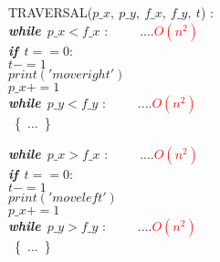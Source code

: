 \documentclass[30pt]{article}
\begin{document}
\begin{algorithm}
TRAVERSAL($p\_x,\ p\_y,\ f\_x,\ f\_y,\ t$) :\\
\hspace{1cm}\textbf{\textit{while}}\ $p\_x<f\_x$ :\ \ \ \ \ ....\textcolor{red}{$O(n^2)$}\\
\hspace{1.7cm}\textbf{\textit{if}}\ $t==0$: \\
\hspace{2.1cm}$t -= 1$ \\
\hspace{2.1cm}$ print('move right')$  \\
\hspace{2.1cm}$ p\_x += 1$ \\

\hspace{1cm}\textbf{\textit{while}}\ $p\_y<f\_y$ :\ \ \ \ \ ....\textcolor{red}{$O(n^2)$}\\
\hspace{1.7cm}\ \{\ ...\ \}

\hspace{1cm}\textbf{\textit{while}}\ $p\_x>f\_x$ :\ \ \ \ \ ....\textcolor{red}{$O(n^2)$}\\
\hspace{1.7cm}\textbf{\textit{if}}\ $t==0$: \\
\hspace{2.1cm}$t -= 1$ \\
\hspace{2.1cm}$ print('move left')$  \\
\hspace{2.1cm}$ p\_x += 1$ \\

\hspace{1cm}\textbf{\textit{while}}\ $p\_y>f\_y$ :\ \ \ \ \ ....\textcolor{red}{$O(n^2)$}\\
\hspace{1.7cm}\ \{\ ...\ \}
\end{algorithm}
\end{document}
